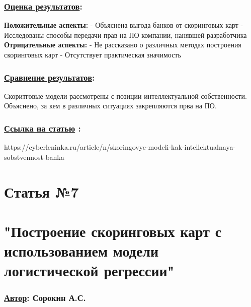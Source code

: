 \documentclass[a4paper,14pt]{article}
\begin{document}
\subsubsection*{\underline{Оценка результатов}:}
\textbf{Положительные аспекты:} \newline
- Объяснена выгода банков от скоринговых карт \newline
- Исследованы способы передачи прав на ПО компании, нанявшей разработчика \vspace{10pt} \newline
\textbf{Отрицательные аспекты:} \newline
- Не рассказано о различных методах построения скоринговых карт \newline
- Отсутствует практическая значимость \newline
\subsubsection*{\underline{Сравнение результатов}:}
Скоритговые модели рассмотрены с позиции интеллектуальной собственности. Объяснено, за кем в различных ситуациях закрепляются прва на ПО. 

\subsubsection*{\underline{Ссылка на статью} :}
https://cyberleninka.ru/article/n/skoringovye-modeli-kak-intellektualnaya-sobstvennost-banka



\newpage


\section*{Статья №7}
\section*{"Построение скоринговых карт с использованием модели \newline логистической регрессии"}
\subsubsection*{\underline {Автор}: Сорокин А.С.}
\end{document}
